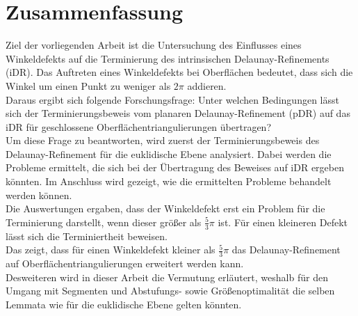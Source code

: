 \chapter*{Zusammenfassung}
Ziel der vorliegenden Arbeit ist die Untersuchung des Einflusses eines Winkeldefekts auf die Terminierung des intrinsischen Delaunay-Refinements (iDR).  Das Auftreten eines Winkeldefekts bei Oberflächen bedeutet, dass sich die Winkel um einen Punkt zu weniger als  $2\pi$ addieren. \\
    Daraus ergibt sich folgende Forschungsfrage: Unter welchen Bedingungen lässt sich der Terminierungsbeweis vom planaren Delaunay-Refinement (pDR)  auf das iDR für geschlossene Oberflächentriangulierungen  übertragen?\\
    Um diese Frage zu beantworten, wird zuerst der Terminierungsbeweis des Delaunay-Refinement für die euklidische Ebene analysiert. Dabei werden die Probleme ermittelt, die sich bei der Übertragung des Beweises auf iDR ergeben könnten.
 Im Anschluss wird gezeigt, wie die ermittelten Probleme behandelt werden können.\\
    Die Auswertungen ergaben, dass der Winkeldefekt erst ein Problem für die Terminierung darstellt, wenn dieser größer als $\frac{5}{3}\pi$  ist. Für einen kleineren Defekt lässt sich die Terminiertheit beweisen.\\
    Das zeigt, dass für einen Winkeldefekt kleiner als $\frac{5}{3} \pi$ das Delaunay-Refinement auf Oberflächentriangulierungen erweitert werden kann.\\
    Desweiteren wird in dieser Arbeit die Vermutung erläutert, weshalb für den Umgang mit Segmenten und Abstufungs- sowie Größenoptimalität die selben Lemmata wie für die euklidische Ebene gelten könnten.
    
